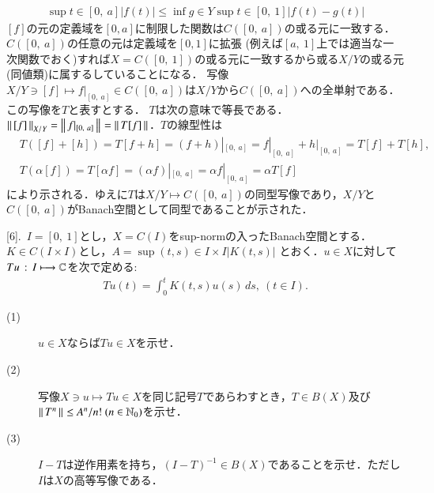 \begin{prf}
\begin{description}
\begin{align}
		\end{align}
		\begin{align}
			\sup{t \in [0,\ a]}{|f(t)|} \leq \inf{g \in Y}{\sup{t \in [0,\ 1]}{|f(t) - g(t)|}}
		\end{align}
		$[f]$の元の定義域を$[0,a]$に制限した関数は$C([0,\ a])$の或る元に一致する．$C([0,\ a])$の任意の元は定義域を$[0,1]$に拡張
		(例えば$[a,\ 1]$上では適当な一次関数でおく)すれば$X=C([0,\ 1])$の或る元に一致するから或る$X/Y$の或る元(同値類)に属するしていることになる．
		写像$X/Y \ni [f] \longmapsto f|_{[0,\ a]} \in C([0,\ a])$は$X/Y$から$C([0,\ a])$への全単射である．この写像を$T$と表すとする．
		$T$は次の意味で等長である．$\left\|\, [f]\, \right\|_{X/Y} = \left\|\, f|_{[0,\ a]}\, \right\|_{} = \left\|\, T[f]\, \right\|_{}$．$T$の線型性は
		\begin{align}
			&T([f] + [h]) = T[f+h] = (f+h)|_{[0,\ a]} = f|_{[0,\ a]} + h|_{[0,\ a]} = T[f] + T[h], \\
			&T(\alpha[f]) = T[\alpha f] = (\alpha f)|_{[0,\ a]} = \alpha f|_{[0,\ a]} = \alpha T[f]
		\end{align}
		により示される．ゆえに$T$は$X/Y \longmapsto C([0,\ a])$の同型写像であり，$X/Y$と$C([0,\ a])$がBanach空間として同型であることが示された．
		\QED
\end{description}
\end{prf}

[6].\ $I=[0,\ 1]$とし，$X=C(I)$をsup-normの入ったBanach空間とする．$K \in C(I \times I)$とし，$A = \sup{(t,s)\in I \times I}{|K(t,s)|}$
とおく．$u \in X$に対して$Tu\, :\, I \longmapsto \mathbb{C}$を次で定める:
\begin{align}
	Tu(t) = \int_{0}^{t} K(t,s)u(s)\, ds,\ (t \in I).
\end{align}
\begin{description}
	\item[(1)] $u \in X$ならば$Tu \in X$を示せ．
	\item[(2)] 写像$X \ni u \longmapsto Tu \in X$を同じ記号$T$であらわすとき，$T \in B(X)$及び$\left\|\, T^n\, \right\|_{} \leq A^n/n!\ (n \in \mathbb{N}_0)$を示せ．
	\item[(3)] $I-T$は逆作用素を持ち，$(I-T)^{-1} \in B(X)$であることを示せ．ただし$I$は$X$の高等写像である．
\end{description}

